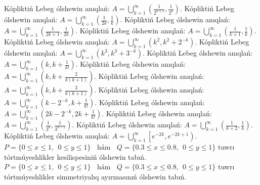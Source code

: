 Kópliktiń Lebeg ólshewin anıqlań: \(A = \bigcup_{k = 1}^{\infty}\left( \frac{1}{2^{k + 1}},\frac{1}{2^{k}} \right)\).
Kópliktiń Lebeg ólshewin anıqlań: \(A = \bigcup_{k = 1}^{\infty}\left( \frac{1}{2k},\frac{1}{k} \right)\).
Kópliktiń Lebeg ólshewin anıqlań: \(A = \bigcup_{k = 1}^{\infty}\left( \frac{1}{2k + 1},\frac{1}{2k} \right)\).
Kópliktiń Lebeg ólshewin anıqlań: \(A = \bigcup_{k = 1}^{\infty}\left( \frac{1}{k + 1},\frac{1}{k} \right)\).
Kópliktiń Lebeg ólshewin anıqlań: \(A = \bigcup_{k = 1}^{\infty}\left( k^{2},k^{2} + 2^{- k} \right)\).
Kópliktiń Lebeg ólshewin anıqlań: \(A = \bigcup_{k = 1}^{\infty}\left( k^{3},k^{3} + 3^{- k} \right)\).
Kópliktiń Lebeg ólshewin anıqlań: \(A = \bigcup_{k = 1}^{\infty}\left( k,k + \frac{1}{k!} \right)\).
Kópliktiń Lebeg ólshewin anıqlań: \(A = \bigcup_{k = 1}^{\infty}\left( k,k + \frac{2}{k(k + 1)} \right)\).
Kópliktiń Lebeg ólshewin anıqlań: \(A = \bigcup_{k = 1}^{\infty}\left( k,k + \frac{3}{k(k + 1)} \right)\).
Kópliktiń Lebeg ólshewin anıqlań: \(A = \bigcup_{k = 1}^{\infty}\left( k - 2^{- k},k + \frac{1}{k!} \right)\).
Kópliktiń Lebeg ólshewin anıqlań: \(A = \bigcup_{k = 1}^{\infty}\left( 2k - 2^{- k},2k + \frac{1}{k!} \right)\).
Kópliktiń Lebeg ólshewin anıqlań: \(A = \bigcup_{k = 1}^{\infty}\left( \frac{1}{3^{k}},\frac{1}{3^{k - 1}} \right)\).
Kópliktiń Lebeg ólshewin anıqlań: \(A = \bigcup_{k = 1}^{\infty}\left( \frac{1}{k + 2},\frac{1}{k} \right)\).
Kópliktiń Lebeg ólshewin anıqlań: \(A = \bigcup_{k = 1}^{\infty}\left\lbrack e^{- 2k},e^{- 2k + 1} \right)\).
\(P = \{ 0 \leq x \leq 1,\ \ 0 \leq y \leq 1\}\ \ \ \ \text{hám}\ \ \ \ Q = \{ 0.3 \leq x \leq 0.8,\ \ 0 \leq y \leq 1\}\) tuwrı tórtmúyeshlikler kesilispesiniń ólshewin tabıń.
\(P = \{ 0 \leq x \leq 1,\ \ 0 \leq y \leq 1\}\ \ \ \ \text{hám}\ \ \ \ Q = \{ 0.3 \leq x \leq 0.8,\ \ 0 \leq y \leq 1\}\) tuwrı tórtmúyeshlikler simmetriyalıq ayırmasınıń ólshewin tabıń.